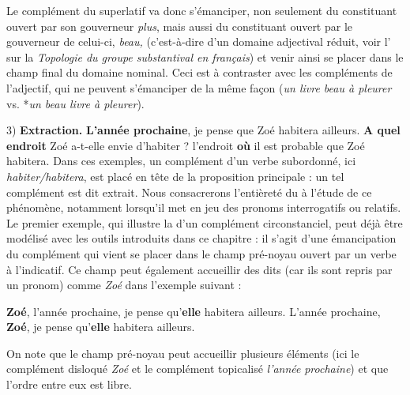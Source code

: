 Le complément du superlatif va donc s’émanciper, non seulement du constituant ouvert par son gouverneur \textit{plus}, mais aussi du constituant ouvert par le gouverneur de celui-ci, \textit{beau,} (c’est-à-dire d’un domaine adjectival réduit, voir l’ sur la \textit{Topologie du groupe substantival en français}) et venir ainsi se placer dans le champ final du domaine nominal. Ceci est à contraster avec les compléments de l’adjectif, qui ne peuvent s’émanciper de la même façon (\textit{un livre beau à pleurer} vs. *\textit{un beau livre à pleurer}).

3) \textbf{Extraction.}
\ea
\textbf{{L’année}  {prochaine}},  {je pense que Zoé habitera ailleurs.}
\z
\ea
\textbf{{A quel endroit}}  {Zoé a-t-elle envie d’habiter} ?
\z
\ea
 {l’endroit} \textbf{{où}}  {il est probable que Zoé habitera.}
\z
Dans ces exemples, un complément d’un verbe subordonné, ici \textit{habiter/habitera}, est placé en tête de la proposition principale : un tel complément est dit extrait. Nous consacrerons l’entièreté du  à l’étude de ce phénomène, notamment lorsqu’il met en jeu des pronoms interrogatifs ou relatifs. Le premier exemple, qui illustre la  d’un complément circonstanciel, peut déjà être modélisé avec les outils introduits dans ce chapitre : il s’agit d’une émancipation du complément qui vient se placer dans le champ pré-noyau ouvert par un verbe à l’indicatif. Ce champ peut également accueillir des  dits  (car ils sont repris par un pronom) comme \textit{Zoé} dans l’exemple suivant :

\ea
    \textbf{{Zoé}},  {l’année}  {prochaine,}  {je pense qu’}\textbf{{elle}}  {habitera ailleurs.}
\z
\ea
    {L’année}  {prochaine,} \textbf{{Zoé}},  {je pense qu’}\textbf{{elle}}  {habitera ailleurs.}
\z

On note que le champ pré-noyau peut accueillir plusieurs éléments (ici le complément disloqué \textit{Zoé} et le complément topicalisé \textit{l’année} \textit{prochaine}) et que l’ordre entre eux est libre.

